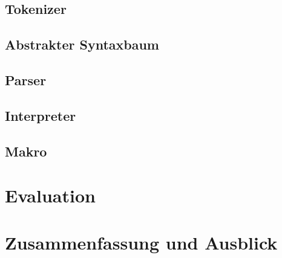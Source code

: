   \subsection{Tokenizer}
  \label{ssec:Tokenizer}

  \subsection{Abstrakter Syntaxbaum}
  \label{ssec:Abstrakter Syntaxbaum}

  \subsection{Parser}
  \label{ssec:Parser}

  \subsection{Interpreter}
  \label{ssec:Interpreter}

  \subsection{Makro}
  \label{ssec:Makro}

\section{Evaluation}
\label{sec:Evaluation}
\section{Zusammenfassung und Ausblick}
\label{sec:Zusammenfassung und Ausblick}

